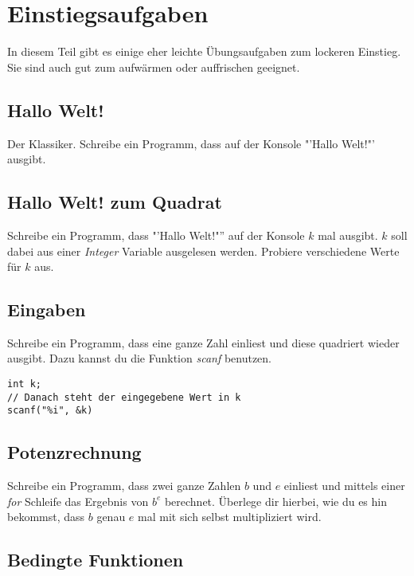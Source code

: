 \documentclass[c_worksheet.tex]{subfiles}
\begin{document}
\chapter{Einstiegsaufgaben}

In diesem Teil gibt es einige eher leichte Übungsaufgaben zum lockeren Einstieg. Sie sind auch gut zum aufwärmen oder auffrischen geeignet.


\section{Hallo Welt!}

Der Klassiker. Schreibe ein Programm, dass auf der Konsole "'Hallo Welt!"' ausgibt.


\section{Hallo Welt! zum Quadrat}

Schreibe ein Programm, dass "'Hallo Welt!"'' auf der Konsole \(k\) mal ausgibt. \(k\) soll dabei aus einer \emph{Integer} Variable ausgelesen werden. Probiere verschiedene Werte für \(k\) aus.


\section{Eingaben}

Schreibe ein Programm, dass eine ganze Zahl einliest und diese quadriert wieder ausgibt. Dazu kannst du die Funktion \emph{scanf} benutzen.

\begin{lstlisting}
int k;
// Danach steht der eingegebene Wert in k
scanf("%i", &k) 
\end{lstlisting}


\section{Potenzrechnung}

Schreibe ein Programm, dass zwei ganze Zahlen \(b\) und \(e\) einliest und mittels einer \emph{for} Schleife das Ergebnis von \(b^e\) berechnet. Überlege dir hierbei, wie du es hin bekommst, dass \(b\) genau \(e\) mal mit sich selbst multipliziert wird.  


\section{Bedingte Funktionen} 
\end{document}
